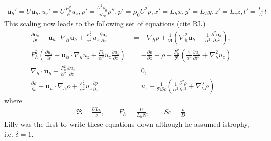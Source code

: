 \begin{align}
\textbf{u}_{h}' = U\textbf{u}_{h}, u_{z}' = U\frac{F_{h}^{2}}{\delta}u_{z}, \rho' = \frac{U^{2}\rho_{0}}{gL_{v}}\rho'', p' = \rho_{0}U^{2}p, x'=L_{h}x, y'=L_{h}y, z'=L_{v}z, t'=\frac{L_{h}}{U}t
\end{align}
This scaling now leads to the following set of equations (cite RL)
\begin{align}
\frac{\partial \textbf{u}_{h}}{\partial t} + \textbf{u}_{h}\cdot\nabla_{h}\textbf{u}_{h}+\frac{F_{h}^{2}}{\alpha^{2}}u_{z}\frac{\partial \textbf{u}_{h}}{\partial z} &= -\nabla_{h}p + \frac{1}{\Re}\left(\nabla^{2}_{h}\textbf{u}_{h}+\frac{1}{\alpha^{2}}\frac{\partial^{2}\textbf{u}_{h}}{\partial z^{2}}\right),\\
F_{h}^{2}\left(\frac{\partial u_{z}}{\partial t} + \textbf{u}_{h}\cdot\nabla_{h}u_{z}+\frac{F_{h}^{2}}{\alpha^{2}}u_{z}\frac{\partial u_{z}}{\partial z}\right) &= -\frac{\partial p}{\partial z} - \rho + \frac{F_{h}^{2}}{\Re}\left(\frac{1}{\alpha^{2}}\frac{\partial u_{z}}{\partial z^{2}} + \nabla^{2}_{h}u_{z}\right)\\
\nabla_{h}\cdot\textbf{u}_{h} + \frac{F_{h}^{2}}{\alpha^{2}}\frac{\partial u_{z}}{\partial z} &=0,\\
\frac{\partial \rho}{\partial t} + \textbf{u}_{h}\cdot\nabla_{h}\rho + \frac{F_{h}^{2}}{\alpha^{2}}u_{z}\frac{\partial \rho}{\partial z} &= u_{z} + \frac{1}{\Re Sc}\left(\frac{1}{\alpha^{2}}\frac{\partial^{2}\rho}{\partial z^{2}} + \nabla^{2}_{h}\rho\right)
\end{align} 
where 
\begin{align}
\Re = \frac{UL_{h}}{\nu}, \qquad F_{h} = \frac{U}{L_{h}N},\qquad Sc = \frac{\nu}{D}
\end{align}
Lilly was the first to write these equations down although he assumed istrophy, i.e. $\delta=1$. 

